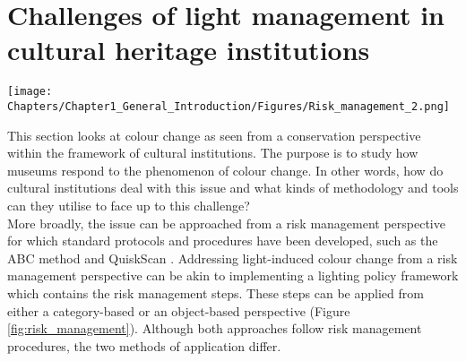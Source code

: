 
\newpage
\section{Challenges of light management in cultural heritage institutions}

\vspace{0.3cm}

\begin{figure*}[!h]
\centering
\texttt{[image: Chapters/Chapter1\_General\_Introduction/Figures/Risk\_management\_2.png]}
\caption[\hspace{0.3cm}Risk management context applied to lighting policy]{Risk management context applied to lighting policy.}
\label{fig:risk_management}
\end{figure*}

\vspace{0.3cm}

This section looks at colour change as seen from a conservation perspective within the framework of cultural institutions. The purpose is to study how museums respond to the phenomenon of colour change. In other words, how do cultural institutions deal with this issue and what kinds of methodology and tools can they utilise to face up to this challenge? \\ 

More broadly, the issue can be approached from a risk management perspective for which standard protocols \citep{international_organization_for_standardization_isotc_262_iso_2018} and procedures have been developed, such as the ABC method \citep{michalski_abc_2016} and QuiskScan \citep{brokerhof_quiskscanquick_2016}. Addressing light-induced colour change from a risk management perspective can be akin to implementing a lighting policy framework which contains the risk management steps. These steps can be applied from either a category-based or an object-based perspective (Figure \ref{fig:risk_management}). Although both approaches follow risk management procedures, the two methods of application differ.  \\ 

